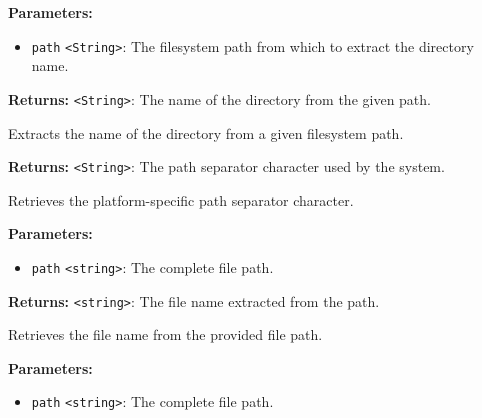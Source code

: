 \documentclass[12pt,a4paper]{article}
\begin{document}
\vspace{5mm}
\noindent {}


\noindent \textbf{Parameters:}
\begin{itemize}
  \item \texttt{path} \texttt{<String>}: The filesystem path from which to extract the directory name.
\end{itemize}

\noindent \textbf{Returns:} \texttt{<String>}: The name of the directory from the given path.

\noindent Extracts the name of the directory from a given filesystem path.

\vspace{5mm}
\noindent {}


\noindent \textbf{Returns:} \texttt{<String>}: The path separator character used by the system.

\noindent Retrieves the platform-specific path separator character.

\vspace{5mm}
\noindent {}


\noindent \textbf{Parameters:}
\begin{itemize}
  \item \texttt{path} \texttt{<string>}: The complete file path.
\end{itemize}

\noindent \textbf{Returns:} \texttt{<string>}: The file name extracted from the path.

\noindent Retrieves the file name from the provided file path.

\vspace{5mm}
\noindent {}


\noindent \textbf{Parameters:}
\begin{itemize}
  \item \texttt{path} \texttt{<string>}: The complete file path.
\end{itemize}
\end{document}
